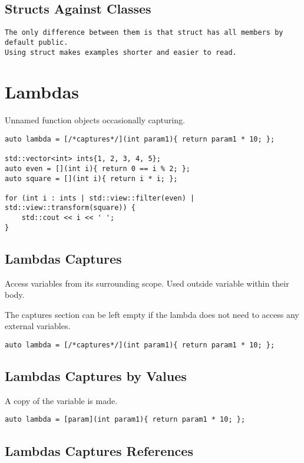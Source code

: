 \subsection{Structs Against Classes}
\begin{verbatim}
The only difference between them is that struct has all members by default public.
Using struct makes examples shorter and easier to read. 
\end{verbatim}

\section{Lambdas}

Unnamed function objects occasionally capturing.

\begin{verbatim}
auto lambda = [/*captures*/](int param1){ return param1 * 10; };

std::vector<int> ints{1, 2, 3, 4, 5};
auto even = [](int i){ return 0 == i % 2; };
auto square = [](int i){ return i * i; }; 

for (int i : ints | std::view::filter(even) | std::view::transform(square)) {
    std::cout << i << ' ';
}
\end{verbatim}

\subsection{Lambdas Captures}

Access variables from its surrounding scope.
Used outside variable within their body.

The captures section can be left empty if
the lambda does not need to access any external variables.

\begin{verbatim}
auto lambda = [/*captures*/](int param1){ return param1 * 10; };
\end{verbatim}

\subsection{Lambdas Captures by Values}

A copy of the variable is made.

\begin{verbatim}
auto lambda = [param](int param1){ return param1 * 10; };
\end{verbatim}

\subsection{Lambdas Captures References}


